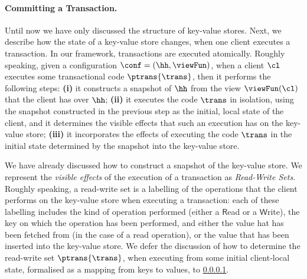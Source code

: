 
\paragraph{Committing a Transaction.}
Until now we have only discussed the structure of key-value stores. 
Next, we describe how the state of a key-value store changes, when 
one client executes a transaction. 
In our framework, transactions are executed atomically. 
Roughly speaking, given a configuration $\conf = (\hh, \viewFun)$, 
when a client $\cl$ executes some transactional code $\ptrans{\trans}$, 
then it performs the following steps: 
\textbf{(i)} it constructs a snapshot of $\hh$ from the view $\viewFun(\cl)$ that 
the client has over $\hh$; \textbf{(ii)} it executes the code $\trans$ in isolation, using the 
snapshot constructed in the previous step as the initial, local state of the client, and it determines the visible 
effects that such an execution has on the key-value store; \textbf{(iii)} it incorporates 
the effects of executing the code $\trans$ in the initial state determined by the snapshot into 
the key-value store.

We have already discussed how to construct a snapshot of the key-value store. 
We represent the \emph{visible effects} of the execution of a transaction as \emph{Read-Write Sets}. 
Roughly speaking, a read-write set is a labelling of the operations that the client performs on  
the key-value store when executing a transaction: each of these labelling includes the kind of 
operation performed (either a $\mathsf{R}$ead or a $\mathsf{W}$rite), 
the key on which the operation has been performed, and either the value hat has been fetched from 
(in the case of a read operation), or the value that has been inserted into the key-value store.
We defer the discussion of how to determine the read-write set $\ptrans{\trans}$, 
when executing from some initial client-local state, formalised as a mapping from keys to values, to 
\cref{}. 

